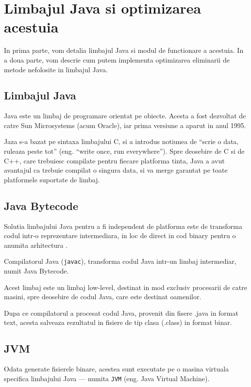 \chapter{Limbajul Java si optimizarea acestuia}

In prima parte, vom detalia limbajul Java si modul de functionare
a acestuia.
In a doua parte, vom descrie cum putem implementa optimizarea
eliminarii de metode nefolosite in limbajul Java.

\section{Limbajul Java}

Java este un limbaj de programare orientat pe obiecte. Acesta a fost
dezvoltat de catre Sun Microsystems (acum Oracle), iar prima versiune a
aparut in anul 1995.

Jaza s-a bazat pe sintaxa limbajului C, si a introdus notiunea de
``scrie o data, ruleaza peste tot'' (eng. ``write once, run
everywhere''). Spre deosebire de C si de C++, care trebuiesc compilate
pentru fiecare platforma tinta, Java a avut avantajul ca trebuie
compilat o singura data, si va merge garantat pe toate platformele
suportate de limbaj.

\section{Java Bytecode}

Solutia limbajului Java pentru a fi independent de platforma este de
transforma codul intr-o reprezentare intermediara, in loc de direct in
cod binary pentru o anumita arhitectura .

Compilatorul Java (\texttt{javac}), transforma codul Java intr-un limbaj
intermediar, numit Java Bytecode.

Acest limbaj este un limbaj low-level, destinat in mod exclusiv
procesarii de catre masini, spre deosebire de codul Java, care este
destinat oamenilor.

Dupa ce compilatorul a procesat codul Java, provenit din fisere .java in
format text, acesta salveaza rezultatul in fisiere de tip clasa (.class)
in format binar.

\section{JVM}

Odata generate fisierele binare, acestea sunt executate pe o masina
virtuala specifica limbajului Java --- numita \texttt{JVM}
(eng. Java Virtual Machine).

